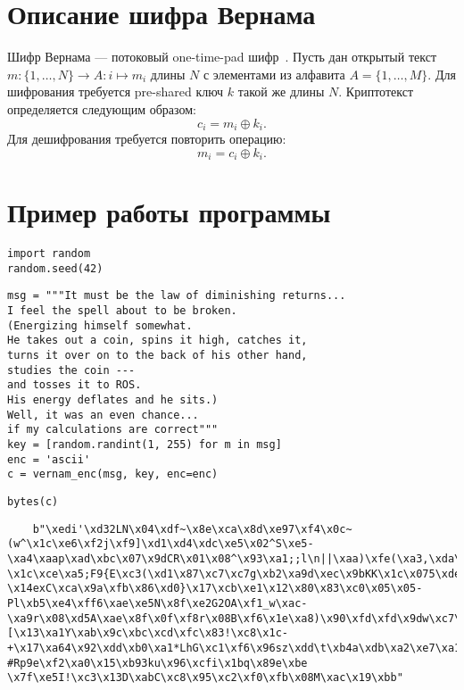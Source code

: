 \documentclass{article}
\begin{document}
\section{Описание шифра Вернама}
Шифр Вернама --- потоковый one-time-pad шифр~\cite{vernam1926cipher}.
Пусть дан открытый текст \( {m: \{1,\ldots, N\} \to A: i\mapsto m_i} \)
длины \( N \) с элементами из алфавита
\( A=\{1,\ldots, M\} \).
Для шифрования требуется pre-shared ключ
\( k \) такой же длины \( N \).
Криптотекст определяется следующим образом:
\[
	c_i = m_i \oplus k_i.
\]
Для дешифрования требуется повторить операцию:
\[
	m_i = c_i \oplus k_i.
\]

\section{Пример работы программы}

\begin{verbatim}
import random
random.seed(42)
\end{verbatim}

\begin{verbatim}
msg = """It must be the law of diminishing returns...
I feel the spell about to be broken.
(Energizing himself somewhat.
He takes out a coin, spins it high, catches it,
turns it over on to the back of his other hand,
studies the coin ---
and tosses it to ROS.
His energy deflates and he sits.)
Well, it was an even chance...
if my calculations are correct"""
key = [random.randint(1, 255) for m in msg]
enc = 'ascii'
c = vernam_enc(msg, key, enc=enc)
\end{verbatim}

\begin{verbatim}
bytes(c)
\end{verbatim}

\begin{verbatim}
    b"\xedi'\xd32LN\x04\xdf~\x8e\xca\x8d\xe97\xf4\x0c~(w^\x1c\xe6\xf2j\xf9]\xd1\xd4\xdc\xe5\x02^S\xe5-\xa4\xaap\xad\xbc\x07\x9dCR\x01\x08^\x93\xa1;;l\n||\xaa)\xfe(\xa3,\xda\x14\xe5U\x8e\xcd\x15z\xae.\xb0\x81\xfd\x91\xb26\xf1\\\x9b\x18$\xefU\xa39\x9a|\xa1U\xb0}B \x1c\xce\xa5;F9{E\xc3(\xd1\x87\xc7\xc7g\xb2\xa9d\xec\x9bKK\x1c\x075\xde\x82\xd1\xc5\xafX\x907\xb7\xac\xa9#\x1b\xa0y\xa6?\x14exC\xca\x9a\xfb\x86\xd0}\x17\xcb\xe1\x12\x80\x83\xc0\x05\x05-Pl\xb5\xe4\xff6\xae\xe5N\x8f\xe2G2OA\xf1_w\xac-\xa9r\x08\xd5A\xae\x8f\x0f\xf8r\x08B\xf6\x1e\xa8)\x90\xfd\xfd\x9dw\xc7\xdcl\x8f\x8b\xeb\xaf!\xe9\xaf+i9\x14@\x10r\xd5\xcd\x89\xdcd\x9a\xee\xad@\xa2\xc71\xf2\xab,\xb6\xc0\xa2\xe8\\[\x13\xa1Y\xab\x9c\xbc\xcd\xfc\x83!\xc8\x1c-+\x17\xa64\x92\xdd\xb0\xa1*LhG\xc1\xf6\x96sz\xdd\t\xb4a\xdb\xa2\xe7\xa1\x01I\xccZ\x80\xe4_7\xa6\xc9\x96:\x92[\x82\xa7\xe2\xd2\xc5\x14\xc01\x14\xdf\xcd\xc9@\x14\x91\xe0\x1a?#Rp9e\xf2\xa0\x15\xb93ku\x96\xcfi\x1bq\x89e\xbe \x7f\xe5I!\xc3\x13D\xabC\xc8\x95\xc2\xf0\xfb\x08M\xac\x19\xbb"
\end{verbatim}
\end{document}
